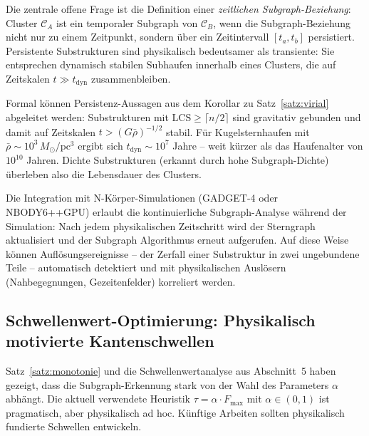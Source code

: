 ﻿\documentclass[a4paper,12pt]{report}
\theoremstyle{definition}
\begin{document}
Die zentrale offene Frage ist die Definition einer \emph{zeitlichen Subgraph-Beziehung}: Cluster $\mathcal{C}_A$ ist ein temporaler Subgraph von $\mathcal{C}_B$, wenn die Subgraph-Beziehung nicht nur zu einem Zeitpunkt, sondern über ein Zeitintervall $[t_a, t_b]$ persistiert. Persistente Substrukturen sind physikalisch bedeutsamer als transiente: Sie entsprechen dynamisch stabilen Subhaufen innerhalb eines Clusters, die auf Zeitskalen $t \gg t_\mathrm{dyn}$ zusammenbleiben.

Formal können Persistenz-Aussagen aus dem Korollar zu Satz~\ref{satz:virial} abgeleitet werden: Substrukturen mit $\mathrm{LCS} \geq \lceil n/2 \rceil$ sind gravitativ gebunden und damit auf Zeitskalen $t > (G\bar{\rho})^{-1/2}$ stabil. Für Kugelsternhaufen mit $\bar{\rho} \sim 10^3 \, M_\odot/\mathrm{pc}^3$ ergibt sich $t_\mathrm{dyn} \sim 10^7$ Jahre -- weit kürzer als das Haufenalter von $10^{10}$ Jahren. Dichte Substrukturen (erkannt durch hohe Subgraph-Dichte) überleben also die Lebensdauer des Clusters.

Die Integration mit N-Körper-Simulationen (\textsc{GADGET-4} oder \textsc{NBODY6++GPU}) erlaubt die kontinuierliche Subgraph-Analyse während der Simulation: Nach jedem physikalischen Zeitschritt wird der Sterngraph aktualisiert und der Subgraph Algorithmus erneut aufgerufen. Auf diese Weise können Auflösungsereignisse -- der Zerfall einer Substruktur in zwei ungebundene Teile -- automatisch detektiert und mit physikalischen Auslösern (Nahbegegnungen, Gezeitenfelder) korreliert werden.

\subsection{Schwellenwert-Optimierung: Physikalisch motivierte Kantenschwellen}

Satz~\ref{satz:monotonie} und die Schwellenwertanalyse aus Abschnitt~5 haben gezeigt, dass die Subgraph-Erkennung stark von der Wahl des Parameters $\alpha$ abhängt. Die aktuell verwendete Heuristik $\tau = \alpha \cdot F_\mathrm{max}$ mit $\alpha \in (0,1)$ ist pragmatisch, aber physikalisch ad hoc. Künftige Arbeiten sollten physikalisch fundierte Schwellen entwickeln.
\end{document}
